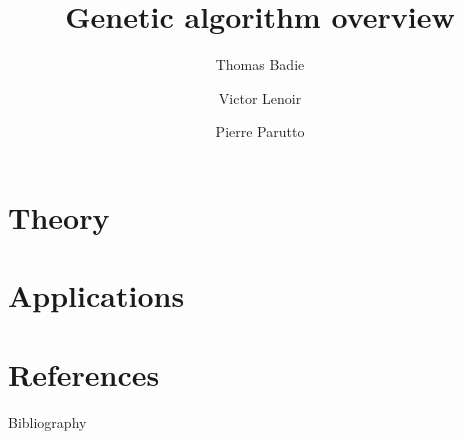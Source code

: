 \documentclass[smaller,pdf,svgnames]{beamer}
\title {Genetic algorithm overview}
\author{Thomas Badie \and Victor Lenoir \and Pierre Parutto}
\institute{LRDE\\Laboratoire de Recherche et D\'eveloppement de l'EPITA}
\begin{document}
\begin{frame}
  \maketitle
\end{frame}

\begin{frame}
  \tableofcontents
\end{frame}

\section{Theory}


\section{Applications}


\section{References}

\begin{frame}{Bibliography}
  \footnotesize
  
  
\end{frame}
\end{document}

